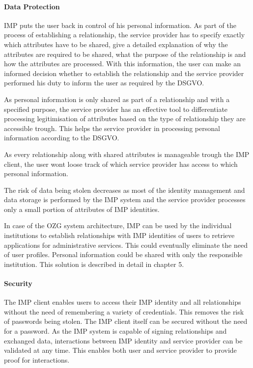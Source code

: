 \paragraph{Data Protection}

IMP puts the user back in control of his personal information. As part of the process of establishing a relationship, the service provider has to specify exactly which attributes have to be shared, give a detailed explanation of why the attributes are required to be shared, what the purpose of the relationship is and how the attributes are processed. With this information, the user can make an informed decision whether to establish the relationship and the service provider performed his duty to inform the user as required by the DSGVO.

As personal information is only shared as part of a relationship and with a specified purpose, the service provider has an effective tool to differentiate processing legitimisation of attributes based on the type of relationship they are accessible trough. This helps the service provider in processing personal information according to the DSGVO.

As every relationship along with shared attributes is manageable trough the IMP client, the user wont loose track of which service provider has access to which personal information.

The risk of data being stolen decreases as most of the identity management and data storage is performed by the IMP system and the service provider processes only a small portion of attributes of IMP identities.

In case of the OZG system architecture, IMP can be used by the individual institutions to establish relationships with IMP identities of users to retrieve applications for administrative services. This could eventually eliminate the need of user profiles. Personal information could be shared with only the responsible institution. This solution is described in detail in chapter 5.

\paragraph{Security}

The IMP client enables users to access their IMP identity and all relationships without the need of remembering a variety of credentials. This removes the risk of passwords being stolen. The IMP client itself can be secured without the need for a password. As the IMP system is capable of signing relationships and exchanged data, interactions between IMP identity and service provider can be validated at any time. This enables both user and service provider to provide proof for interactions.


